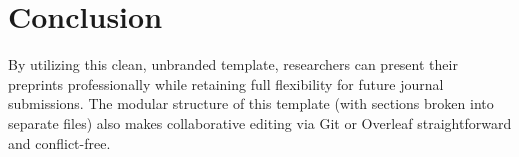 \section{Conclusion}
By utilizing this clean, unbranded template, researchers can present their preprints professionally while retaining full flexibility for future journal submissions. The modular structure of this template (with sections broken into separate files) also makes collaborative editing via Git or Overleaf straightforward and conflict-free.
